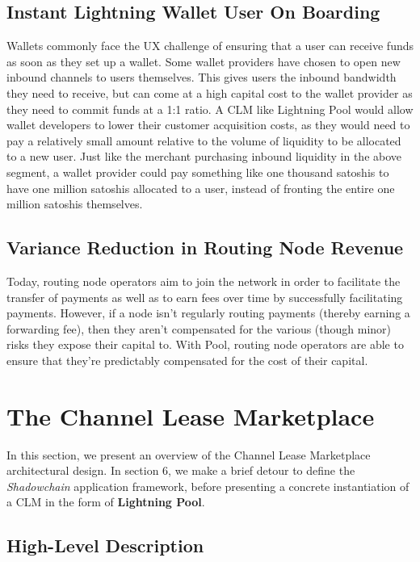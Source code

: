 \documentclass[10pt,a4paper]{article}
\theoremstyle{definition}
\begin{document}
\subsection{Instant Lightning Wallet User On Boarding}

Wallets commonly face the UX challenge of ensuring that a user can receive
funds as soon as they set up a wallet. Some wallet providers have chosen to
open new inbound channels to users themselves. This gives users the inbound
bandwidth they need to receive, but can come at a high capital cost to the
wallet provider as they need to commit funds at a 1:1 ratio. A CLM like
Lightning Pool would allow wallet developers to lower their customer
acquisition costs, as they would need to pay a relatively small amount relative
to the volume of liquidity to be allocated to a new user. Just like the
merchant purchasing inbound liquidity in the above segment, a wallet provider
could pay something like one thousand satoshis to have one million satoshis
allocated to a user, instead of fronting the entire one million satoshis
themselves.

\subsection{Variance Reduction in Routing Node Revenue}

Today, routing node operators aim to join the network in order to facilitate
the transfer of payments as well as to earn fees over time by successfully
facilitating payments. However, if a node isn't regularly routing payments
(thereby earning a forwarding fee), then they aren't compensated for the
various (though minor) risks they expose their capital to. With Pool, routing
node operators are able to ensure that they're predictably compensated for the
cost of their capital.

\section{The Channel Lease Marketplace} %

In this section, we present an overview of the Channel Lease Marketplace
architectural design. In section 6, we make a brief detour to define the
\emph{Shadowchain} application framework, before presenting a concrete
instantiation of a CLM in the form of \textbf{Lightning Pool}.

\subsection{High-Level Description}
\end{document}
